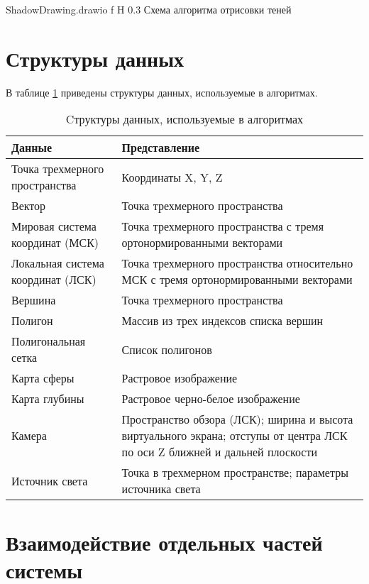 {ShadowDrawing.drawio}
{f}
{H}
{0.3\textwidth}
{Схема алгоритма отрисовки теней}

\section{Структуры данных}

В таблице \ref{DataStructures} приведены структуры данных, используемые в алгоритмах.

\begin{table}[H]
	\caption{Cтруктуры данных, используемые в алгоритмах}
	\label{DataStructures}
	\begin{center}
		\begin{tabular}{| p{4 cm} | p{11 cm} |} 
			\hline
			Данные & Представление \\
			\hline
			Точка трехмерного пространства & Координаты X, Y, Z \\
			\hline
			Вектор & Точка трехмерного пространства  \\
			\hline
			Мировая система координат (МСК) & Точка трехмерного пространства с тремя ортонормированными векторами \\
			\hline
			Локальная система координат (ЛСК) & Точка трехмерного пространства относительно МСК с тремя ортонормированными векторами \\
			\hline
			Вершина & Точка трехмерного пространства \\
			\hline
			Полигон & Массив из трех индексов списка вершин \\
			\hline
			Полигональная сетка & Список полигонов \\
			\hline
			Карта сферы & Растровое изображение \\
			\hline
			Карта глубины & Растровое черно-белое изображение \\
			\hline
			Камера & Пространство обзора (ЛСК); ширина и высота виртуального экрана; отступы от центра ЛСК по оси Z ближней и дальней плоскости \\
			\hline
			Источник света & Точка в трехмерном пространстве; параметры источника света \\
			\hline
		\end{tabular}
	\end{center}
\end{table}

\section{Взаимодействие отдельных частей системы}


